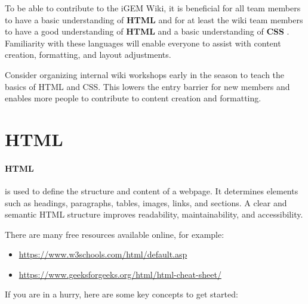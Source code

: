 
To be able to contribute to the iGEM Wiki, it is beneficial for all team members to have a basic understanding of \textbf{HTML} and for at least the wiki team members to have a good understanding of \textbf{HTML} and a basic understanding of \textbf{CSS }.
Familiarity with these languages will enable everyone to assist with content creation, formatting, and layout
adjustments.

Consider organizing internal wiki workshops early in the season to teach the basics of HTML and CSS. This lowers the entry barrier for new members and enables more people to contribute to content creation and formatting. \\ \newline


\section{HTML}\label{sec:html}

\paragraph{HTML} is used to define the structure and content of a webpage.
It determines elements such as
headings, paragraphs, tables, images, links, and sections.
A clear and semantic HTML structure improves readability, maintainability, and accessibility. \\ \newline

There are many free resources available online, for example:
\begin{itemize}
    \item \url{https://www.w3schools.com/html/default.asp}
    \item \url{https://www.geeksforgeeks.org/html/html-cheat-sheet/}
\end{itemize}

If you are in a hurry, here are some key concepts to get started:

